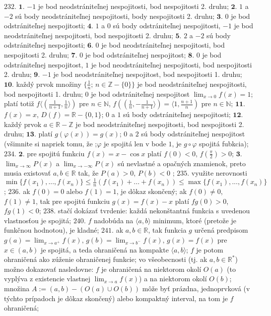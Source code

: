 $\boxed{232.}$ $\boldsymbol{1.}$ $-1$ je bod neodstrániteľnej nespojitosti, bod nespojitosti 2. druhu;
$\boldsymbol{2.}$ $1$ a $-2$ sú body neodstrániteľnej nespojitosti, body nespojitosti 2. druhu;
$\boldsymbol{3.}$ $0$ je bod odstrániteľnej nespojitosti;
$\boldsymbol{4.}$ $1$ a $0$ sú body odstrániteľnej nespojitosti, $-1$ je bod neodstrániteľnej nespojitosti, bod nespojitosti 2. druhu;
$\boldsymbol{5.}$ $2$ a $-2$ sú body odstrániteľnej nespojitosti;
$\boldsymbol{6.}$ $0$ je bod neodstrániteľnej nespojitosti, bod nespojitosti 2. druhu;
$\boldsymbol{7.}$ $0$ je bod odstrániteľnej nespojitost;
$\boldsymbol{8.}$ $0$ je bod odstrániteľnej nespojitost, $1$ je bod neodstrániteľnej nespojitosti, bod nespojitosti 2. druhu;
$\boldsymbol{9.}$ $-1$ je bod neodstrániteľnej nespojitost, bod nespojitosti 1. druhu;
$\boldsymbol{10.}$ každý prvok množiny $\lbrace \frac{1}{n}; \, n \in \mathbb{Z} -\lbrace 0 \rbrace \rbrace$ je bod neodstrániteľnej nespojitosti, bod nespojitosti 1. druhu;  $0$ je bod odstrániteľnej nespojitost  $\lim_{x \to 0} f(x) =1$; platí totiž $f \langle ( \frac{1}{n+1}, \frac{1}{n} \rangle ) $ pre  $n \in \mathbb{N}$,  $f (( \frac{1}{n}, -\frac{1}{n+1} \rangle ) = \langle 1, \frac{n+1}{n})$ pre  $n \in \mathbb{N}$;
$\boldsymbol{11.}$ $f(x) = x$, $D(f) = \mathbb{R} - \lbrace 0,1 \rbrace$; $0$ a $1$ sú body odstrániteľnej nespojitosti;
$\boldsymbol{12.}$ každý prvok  $a \in\mathbb{R}- \mathbb{Z} $ je bod neodstrániteľnej nespojitosti, bod nespojitosti 2. druhu;
$\boldsymbol{13.} $ platí $g(\varphi (x)) = g(x)$;  $0$ a  $2$ sú body odstrániteľnej nespojitost (všimnite si napriek tomu, že ;$\varphi $ je spojitá len v bode $1$, je $g \circ \varphi $ spojitá fubkcia);
$\boxed{234.}$ $\boldsymbol{2.}$ pre spojitú funkciu  $f(x) = x- \cos x$ platí  $f(0)<0$, $f(\frac{\pi}{2})>0$;
$\boldsymbol{3.}$ $\lim_{x \to \infty} P(x) $ a $\lim_{x \to -\infty} P(x) $ sú nevlastné a opačných znamienok, preto musia existovať $a,b \in \mathbb{R}$ tak, že $P(a)> 0$, $P(b)< 0 $ ;
$\boxed{235.}$ využite nerovnosti $\min \lbrace f(x_{1}),..., f(x_{n}) \rbrace \leq \frac{1}{n}(f(x_{1})+...+f(x_{n}))\leq \max \lbrace f(x_{1}),..., f(x_{n}) \rbrace$;
$\boxed{236.}$ ak $f(0)=0$ alebo   $f(1)=1$, je dôkaz skončený; ak  $f(0)\ne 0$, $f(1)\ne 1$, tak  pre  spojitú  funkciu  $g(x) = f(x)-x $ platí  $fg(0)>0$, $fg(1)< 0$;
$\boxed{238.}$ stačí dokázať tvrdenie: každá nekonštantná funkcia s uvedenou vlastnosťou je spojitá;
$\boxed{240.}$ $f$ nadobúda na $\langle a,b \rangle$ minimum, ktoré (pretože je funkčnou hodnotou), je kladné;
$\boxed{241.}$ ak $a,b \in \mathbb{R}$, tak funkcia $g$ určená predpisom $g(a) = \lim_{x \to a^{+} }f(x), \, g(b) = \lim_{x \to b^{-}} f(x), \, g(x)=f(x)$ pre $x \in (a,b)$ je spojitá, a teda ohraničená na kompakte $\langle a,b \rangle$; $f$ je potom ohraničená ako zúženie ohraničenej funkcie; vo všeobecnosti (tj. ak $a, b \in \mathbb{R^{*}}$) možno dokazovať nasledovne: $f$ je ohraničená na niektorom okolí $O(a)$ (to vyplýva z existencie vlastnej  $\lim_{x \to a} f(x)$)  a na niektorom okolí $O(b)$; množina $A:=(a,b)-(O(a) \cup O(b)) $ môže byť prázdna, jednoprvková (v týchto prípadoch je dôkaz skončený) alebo kompaktný interval, na tom je $f$ ohraničená;
